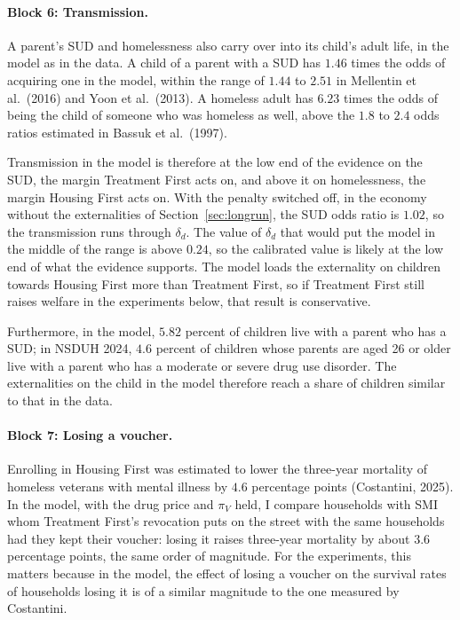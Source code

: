 \documentclass[10pt]{article}
\begin{document}
\paragraph{Block 6: Transmission.} A parent's SUD and homelessness also carry over into its child's adult life, in the model as in the data. A child of a parent with a SUD has $1.46$ times the odds of acquiring one in the model, within the range of $1.44$ to $2.51$ in Mellentin et al.\ (2016) and Yoon et al.\ (2013).  A homeless adult has $6.23$ times the odds of being the child of someone who was homeless as well, above the $1.8$ to $2.4$ odds ratios estimated in Bassuk et al.\ (1997).

Transmission in the model is therefore at the low end of the evidence on the SUD, the margin Treatment First acts on, and above it on homelessness, the margin Housing First acts on. With the penalty switched off, in the economy without the externalities of Section~\ref{sec:longrun}, the SUD odds ratio is $1.02$, so the transmission runs through $\delta_d$. The value of $\delta_d$ that would put the model in the middle of the range is above $0.24$, so the calibrated value is likely at the low end of what the evidence supports. The model loads the externality on children towards Housing First more than Treatment First, so if Treatment First still raises welfare in the experiments below, that result is conservative.

Furthermore, in the model, $5.82$ percent of children live with a parent who has a SUD; in NSDUH 2024, $4.6$ percent of children whose parents are aged 26 or older live with a parent who has a moderate or severe drug use disorder. The externalities on the child in the model therefore reach a share of children similar to that in the data.

\paragraph{Block 7: Losing a voucher.} Enrolling in Housing First was estimated to lower the three-year mortality of homeless veterans with mental illness by $4.6$ percentage points (Costantini, 2025). In the model, with the drug price and $\pi_V$ held, I compare households with SMI whom Treatment First's revocation puts on the street with the same households had they kept their voucher: losing it raises three-year mortality by about $3.6$ percentage points, the same order of magnitude.   For the experiments, this matters because in the model, the effect of losing a voucher on the survival rates of households losing it is of a similar magnitude to the one measured by Costantini.
\end{document}
